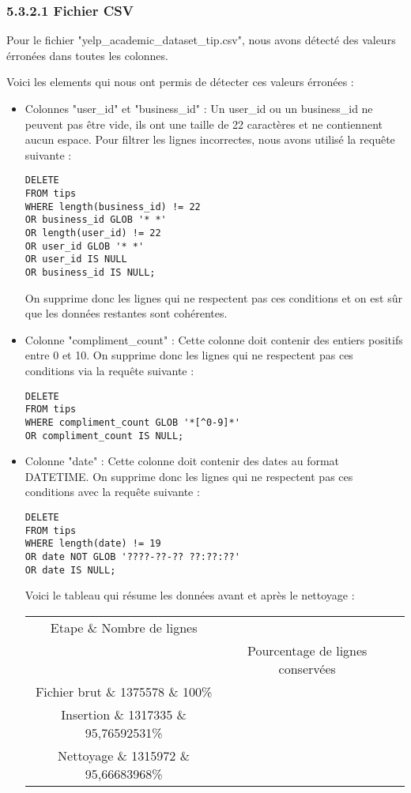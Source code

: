 \subsubsection{5.3.2.1 Fichier CSV}

Pour le fichier "yelp_academic_dataset_tip.csv", nous avons détecté des valeurs érronées dans toutes les colonnes.

Voici les elements qui nous ont permis de détecter ces valeurs érronées :

\begin{itemize}
\item Colonnes "user\_id" et "business\_id" : Un user\_id ou un business\_id ne peuvent pas être vide, ils ont une taille de 22 caractères et ne contiennent aucun espace.
Pour filtrer les lignes incorrectes, nous avons utilisé la requête suivante :

\begin{verbatim}
DELETE
FROM tips
WHERE length(business_id) != 22
OR business_id GLOB '* *'
OR length(user_id) != 22
OR user_id GLOB '* *'
OR user_id IS NULL
OR business_id IS NULL;
\end{verbatim}

On supprime donc les lignes qui ne respectent pas ces conditions et on est sûr que les données restantes sont cohérentes.

\item Colonne "compliment_count" : Cette colonne doit contenir des entiers positifs entre 0 et 10. On supprime donc les lignes qui ne respectent pas ces conditions via la requête suivante :

\begin{verbatim}
DELETE
FROM tips
WHERE compliment_count GLOB '*[^0-9]*'
OR compliment_count IS NULL;
\end{verbatim}

\item Colonne "date" : Cette colonne doit contenir des dates au format DATETIME. On supprime donc les lignes qui ne respectent pas ces conditions avec la requête suivante :

\begin{verbatim}
DELETE
FROM tips
WHERE length(date) != 19
OR date NOT GLOB '????-??-?? ??:??:??'
OR date IS NULL;
\end{verbatim}


Voici le tableau qui résume les données avant et après le nettoyage :

\begin{center}
\begin{tabular}{|c|c|c|}
\hline
Etape \& Nombre de lignes \\& Pourcentage de lignes conservées \\
\hline
Fichier brut \& 1375578 \& 100\% \\
\hline
Insertion \& 1317335 \& 95,76592531\% \\
\hline
Nettoyage \& 1315972 \& 95,66683968\% \\
\hline
\end{tabular}
\end{center}


\end{itemize}
